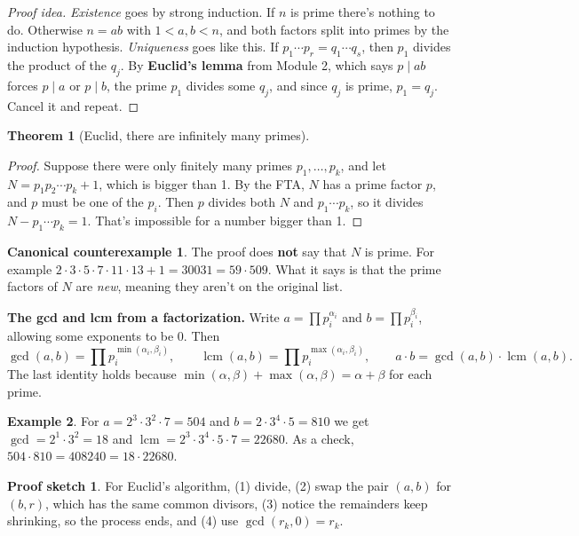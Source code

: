 \documentclass[11pt,a4paper]{article}
\newtheorem{theorem}{Theorem}[section]
\theoremstyle{definition}
\newtheorem{example}[theorem]{Example}
\DeclareMathOperator{\lcm}{lcm}
\theoremstyle{noteit}
\theoremstyle{note}
\newtheorem*{sketch}{Proof sketch}
\newtheorem*{counter}{Canonical counterexample}
\begin{document}
\begin{proof}[Proof idea]
\emph{Existence} goes by strong induction. If $n$ is prime there's nothing to do. Otherwise $n=ab$ with $1<a,b<n$, and both factors split into primes by the induction hypothesis. \emph{Uniqueness} goes like this. If $p_1\cdots p_r=q_1\cdots q_s$, then $p_1$ divides the product of the $q_j$. By \textbf{Euclid's lemma} from Module 2, which says $p\mid ab$ forces $p\mid a$ or $p\mid b$, the prime $p_1$ divides some $q_j$, and since $q_j$ is prime, $p_1=q_j$. Cancel it and repeat.
\end{proof}

\begin{theorem}[Euclid, there are infinitely many primes]
\end{theorem}
\begin{proof}
Suppose there were only finitely many primes $p_1,\dots,p_k$, and let $N=p_1p_2\cdots p_k+1$, which is bigger than 1. By the FTA, $N$ has a prime factor $p$, and $p$ must be one of the $p_i$. Then $p$ divides both $N$ and $p_1\cdots p_k$, so it divides $N-p_1\cdots p_k=1$. That's impossible for a number bigger than 1.
\end{proof}

\begin{counter}
The proof does \textbf{not} say that $N$ is prime. For example $2\cdot3\cdot5\cdot7\cdot11\cdot13+1=30031=59\cdot 509$. What it says is that the prime factors of $N$ are \emph{new}, meaning they aren't on the original list.
\end{counter}

\textbf{The gcd and lcm from a factorization.} Write $a=\prod p_i^{\alpha_i}$ and $b=\prod p_i^{\beta_i}$, allowing some exponents to be $0$. Then
\[
\gcd(a,b)=\prod p_i^{\min(\alpha_i,\beta_i)},\qquad \lcm(a,b)=\prod p_i^{\max(\alpha_i,\beta_i)},\qquad a\cdot b=\gcd(a,b)\cdot\lcm(a,b).
\]
The last identity holds because $\min(\alpha,\beta)+\max(\alpha,\beta)=\alpha+\beta$ for each prime.

\begin{example}
For $a=2^3\cdot3^2\cdot7=504$ and $b=2\cdot3^4\cdot5=810$ we get $\gcd=2^1\cdot3^2=18$ and $\lcm=2^3\cdot3^4\cdot5\cdot7=22680$. As a check, $504\cdot810=408240=18\cdot22680$.
\end{example}

\begin{sketch}
For Euclid's algorithm, (1) divide, (2) swap the pair $(a,b)$ for $(b,r)$, which has the same common divisors, (3) notice the remainders keep shrinking, so the process ends, and (4) use $\gcd(r_k,0)=r_k$.
\end{sketch}
\end{document}
